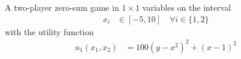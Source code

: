 \noindent
\begin{minipage}[c]{0.6\textwidth}
\begin{game}\label{ex.surjanovic.rosen}
A two-player zero-sum game in $1 \times 1$ variables on the interval
\begin{align*}
    x_i &\in [-5,10] \quad \forall i \in \{1,2\}
\end{align*}
with the utility function \cite[Rosenbrock]{surjanovic13}
\begin{align*}
u_{1}{\left( x_{1}, x_{2} \right)} &= 100 (y - x^2)^2 + (x - 1)^2
\end{align*}
\end{game}
\strut
\end{minipage}
\hfill
\begin{minipage}[c]{0.35\textwidth}
\end{minipage}